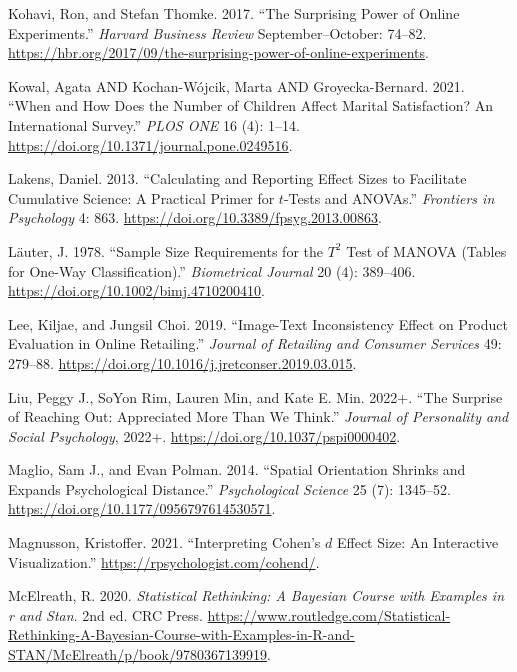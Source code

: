 \documentclass[
  11pt,
  letterpaper,
]{scrbook}
\newlength{\cslhangindent}
\newlength{\cslentryspacingunit} %
\newenvironment{CSLReferences}[2] %
 {%
  \setlength{\parindent}{0pt}
  \ifodd #1
  \let\oldpar\par
  \def\par{\hangindent=\cslhangindent\oldpar}
  \fi
  \setlength{\parskip}{#2\cslentryspacingunit}
 }%
 {}
\theoremstyle{definition}
\theoremstyle{remark}
\begin{document}
\begin{CSLReferences}{1}{0}
\leavevmode{}%
Kohavi, Ron, and Stefan Thomke. 2017. {``The Surprising Power of Online
Experiments.''} \emph{Harvard Business Review} September--October:
74--82.
\url{https://hbr.org/2017/09/the-surprising-power-of-online-experiments}.

\leavevmode{}%
Kowal, Agata AND Kochan-Wójcik, Marta AND Groyecka-Bernard. 2021.
{``When and How Does the Number of Children Affect Marital Satisfaction?
An International Survey.''} \emph{PLOS ONE} 16 (4): 1--14.
\url{https://doi.org/10.1371/journal.pone.0249516}.

\leavevmode{}%
Lakens, Daniel. 2013. {``Calculating and Reporting Effect Sizes to
Facilitate Cumulative Science: A Practical Primer for \(t\)-Tests and
ANOVAs.''} \emph{Frontiers in Psychology} 4: 863.
\url{https://doi.org/10.3389/fpsyg.2013.00863}.

\leavevmode{}%
Läuter, J. 1978. {``Sample Size Requirements for the \(T^2\) Test of
{MANOVA} (Tables for One-Way Classification).''} \emph{Biometrical
Journal} 20 (4): 389--406.
\url{https://doi.org/10.1002/bimj.4710200410}.

\leavevmode{}%
Lee, Kiljae, and Jungsil Choi. 2019. {``Image-Text Inconsistency Effect
on Product Evaluation in Online Retailing.''} \emph{Journal of Retailing
and Consumer Services} 49: 279--88.
\url{https://doi.org/10.1016/j.jretconser.2019.03.015}.

\leavevmode{}%
Liu, Peggy J., SoYon Rim, Lauren Min, and Kate E. Min. 2022+. {``The
Surprise of Reaching Out: Appreciated More Than We Think.''}
\emph{Journal of Personality and Social Psychology}, 2022+.
\url{https://doi.org/10.1037/pspi0000402}.

\leavevmode{}%
Maglio, Sam J., and Evan Polman. 2014. {``Spatial Orientation Shrinks
and Expands Psychological Distance.''} \emph{Psychological Science} 25
(7): 1345--52. \url{https://doi.org/10.1177/0956797614530571}.

\leavevmode{}%
Magnusson, Kristoffer. 2021. {``Interpreting {C}ohen's \(d\) Effect
Size: An Interactive Visualization.''}
\url{https://rpsychologist.com/cohend/}.

\leavevmode{}%
McElreath, R. 2020. \emph{Statistical Rethinking: A Bayesian Course with
Examples in r and Stan}. 2nd ed. CRC Press.
\url{https://www.routledge.com/Statistical-Rethinking-A-Bayesian-Course-with-Examples-in-R-and-STAN/McElreath/p/book/9780367139919}.


\end{CSLReferences}
\end{document}
